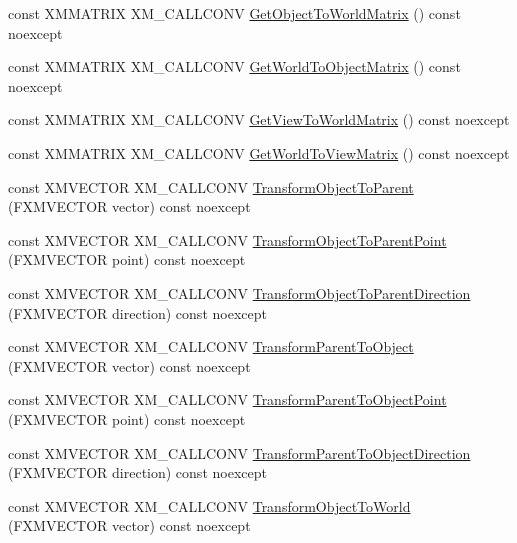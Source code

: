 \begin{DoxyCompactItemize}
\item 
const X\+M\+M\+A\+T\+R\+IX X\+M\+\_\+\+C\+A\+L\+L\+C\+O\+NV \hyperlink{classmage_1_1_transform_node_aa984b3af4dbff225bc3890d58f71abe6}{Get\+Object\+To\+World\+Matrix} () const noexcept
\item 
const X\+M\+M\+A\+T\+R\+IX X\+M\+\_\+\+C\+A\+L\+L\+C\+O\+NV \hyperlink{classmage_1_1_transform_node_a09566d36553dcf4bb832df5b7c9a1745}{Get\+World\+To\+Object\+Matrix} () const noexcept
\item 
const X\+M\+M\+A\+T\+R\+IX X\+M\+\_\+\+C\+A\+L\+L\+C\+O\+NV \hyperlink{classmage_1_1_transform_node_a98c7c4b977174b6b28cadb9db327aaef}{Get\+View\+To\+World\+Matrix} () const noexcept
\item 
const X\+M\+M\+A\+T\+R\+IX X\+M\+\_\+\+C\+A\+L\+L\+C\+O\+NV \hyperlink{classmage_1_1_transform_node_ae8c6162b3715c2065c31228cb06c457b}{Get\+World\+To\+View\+Matrix} () const noexcept
\item 
const X\+M\+V\+E\+C\+T\+OR X\+M\+\_\+\+C\+A\+L\+L\+C\+O\+NV \hyperlink{classmage_1_1_transform_node_a8a19577750036d8365cca5b4e38c08b9}{Transform\+Object\+To\+Parent} (F\+X\+M\+V\+E\+C\+T\+OR vector) const noexcept
\item 
const X\+M\+V\+E\+C\+T\+OR X\+M\+\_\+\+C\+A\+L\+L\+C\+O\+NV \hyperlink{classmage_1_1_transform_node_a449428a24f76ca18b91f84ba3e69c0f3}{Transform\+Object\+To\+Parent\+Point} (F\+X\+M\+V\+E\+C\+T\+OR point) const noexcept
\item 
const X\+M\+V\+E\+C\+T\+OR X\+M\+\_\+\+C\+A\+L\+L\+C\+O\+NV \hyperlink{classmage_1_1_transform_node_af3f7d31eeb595ac51fe2362c91688398}{Transform\+Object\+To\+Parent\+Direction} (F\+X\+M\+V\+E\+C\+T\+OR direction) const noexcept
\item 
const X\+M\+V\+E\+C\+T\+OR X\+M\+\_\+\+C\+A\+L\+L\+C\+O\+NV \hyperlink{classmage_1_1_transform_node_aa649804646f82257522c5136f0d4d2a0}{Transform\+Parent\+To\+Object} (F\+X\+M\+V\+E\+C\+T\+OR vector) const noexcept
\item 
const X\+M\+V\+E\+C\+T\+OR X\+M\+\_\+\+C\+A\+L\+L\+C\+O\+NV \hyperlink{classmage_1_1_transform_node_afb966684b63c5e24845fa93a53802b5f}{Transform\+Parent\+To\+Object\+Point} (F\+X\+M\+V\+E\+C\+T\+OR point) const noexcept
\item 
const X\+M\+V\+E\+C\+T\+OR X\+M\+\_\+\+C\+A\+L\+L\+C\+O\+NV \hyperlink{classmage_1_1_transform_node_ab7c1a1559d407f36deb342095b37e7b9}{Transform\+Parent\+To\+Object\+Direction} (F\+X\+M\+V\+E\+C\+T\+OR direction) const noexcept
\item 
const X\+M\+V\+E\+C\+T\+OR X\+M\+\_\+\+C\+A\+L\+L\+C\+O\+NV \hyperlink{classmage_1_1_transform_node_a93cad83498de7702b0c888260862ec39}{Transform\+Object\+To\+World} (F\+X\+M\+V\+E\+C\+T\+OR vector) const noexcept

\end{DoxyCompactItemize}
